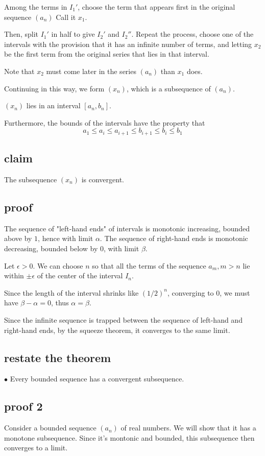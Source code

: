 \documentclass[11pt, oneside]{article}
\begin{document}
Among the terms in $I_1'$, choose the term that appears first in the original sequence $(a_n)$  Call it $x_1$.

Then, split $I_1'$ in half to give $I_2'$ and $I_2''$.  Repeat the process, choose one of the intervals with the provision that it has an infinite number of terms, and letting $x_2$ be the first term from the original series that lies in that interval.

Note that $x_2$ must come later in the series $(a_n)$ than $x_1$ does. 

Continuing in this way, we form $(x_n)$, which is a subsequence of $(a_n)$.  

$(x_n)$ lies in an interval $[a_n,b_n]$.

Furthermore, the bounds of the intervals have the property that
\[ a_1 \le a_i \le a_{i+1} \le b_{i+1} \le b_i \le b_1 \]

\subsection*{claim}

The subsequence $(x_n)$ is convergent.

\subsection*{proof}
The sequence of "left-hand ends" of intervals is monotonic increasing, bounded above by $1$, hence with limit $\alpha$.  The sequence of right-hand ends is monotonic decreasing, bounded below by $0$, with limit $\beta$.

Let $\epsilon > 0$.  We can choose $n$ so that all the terms of the sequence $a_m, m > n$ lie within $\pm \epsilon$ of the center of the interval $I_n$.

Since the length of the interval shrinks like $(1/2)^n$, converging to $0$, we must have $\beta - \alpha = 0$, thus $\alpha = \beta$.

Since the infinite sequence is trapped between the sequence of left-hand and right-hand ends, by the squeeze theorem, it converges to the same limit.

\subsection*{restate the theorem}

$\bullet$  Every bounded sequence has a convergent subsequence.

\subsection*{proof 2}
Consider a bounded sequence $(a_n)$ of real numbers.  We will show that it has a monotone subsequence.  Since it's montonic and bounded, this subsequence then converges to a limit.
\end{document}
